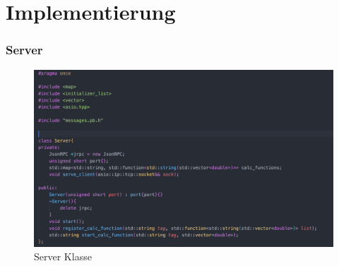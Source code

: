 \documentclass[german,oneside,color]{htldipl}
\begin{document}
\chapter{Implementierung}
\subsection{Server}
\begin{figure}[h!]
  \centering
  \includegraphics[width=1\textwidth]{images/Server_class.png}
  \caption{Server Klasse}
  \label{Server_h}
\end{figure}    
\end{document}
